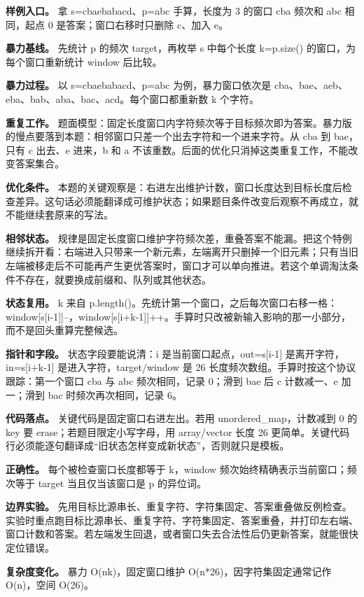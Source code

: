 \textbf{样例入口。} 拿 s=cbaebabacd、p=abc 手算，长度为 3 的窗口 cba 频次和 abc 相同，起点 0 是答案；窗口右移时只删除 c、加入 e。

\textbf{暴力基线。} 先统计 p 的频次 target，再枚举 s 中每个长度 k=p.size() 的窗口，为每个窗口重新统计 window 后比较。

\textbf{暴力过程。} 以 s=cbaebabacd、p=abc 为例，暴力窗口依次是 cba、bae、aeb、eba、bab、aba、bac、acd。每个窗口都重新数 k 个字符。

\textbf{重复工作。} 题面模型：固定长度窗口内字符频次等于目标频次即为答案。暴力版的慢点要落到本题：相邻窗口只差一个出去字符和一个进来字符。从 cba 到 bae，只有 c 出去、e 进来，b 和 a 不该重数。后面的优化只消掉这类重复工作，不能改变答案集合。

\textbf{优化条件。} 本题的关键观察是：右进左出维护计数，窗口长度达到目标长度后检查差异。这句话必须能翻译成可维护状态；如果题目条件改变后观察不再成立，就不能继续套原来的写法。

\textbf{相邻状态。} 规律是固定长度窗口维护字符频次差，重叠答案不能漏。把这个特例继续拆开看：右端进入只带来一个新元素，左端离开只删掉一个旧元素；只有当旧左端被移走后不可能再产生更优答案时，窗口才可以单向推进。若这个单调淘汰条件不存在，就要换成前缀和、队列或其他状态。

\textbf{状态复用。} k 来自 p.length()。先统计第一个窗口，之后每次窗口右移一格：window[s[i-1]]--，window[s[i+k-1]]++。手算时只改被新输入影响的那一小部分，而不是回头重算完整候选。

\textbf{指针和字段。} 状态字段要能说清：i 是当前窗口起点，out=s[i-1] 是离开字符，in=s[i+k-1] 是进入字符，target/window 是 26 长度频次数组。手算时按这个协议跟踪：第一个窗口 cba 与 abc 频次相同，记录 0；滑到 bae 后 c 计数减一、e 加一；滑到 bac 时频次再次相同，记录 6。

\textbf{代码落点。} 关键代码是固定窗口右进左出。若用 unordered\_map，计数减到 0 的 key 要 erase；若题目限定小写字母，用 array/vector 长度 26 更简单。关键代码行必须能逐句翻译成“旧状态怎样变成新状态”，否则就只是模板。

\textbf{正确性。} 每个被检查窗口长度都等于 k，window 频次始终精确表示当前窗口；频次等于 target 当且仅当该窗口是 p 的异位词。

\textbf{边界实验。} 先用目标比源串长、重复字符、字符集固定、答案重叠做反例检查。实验时重点跑目标比源串长、重复字符、字符集固定、答案重叠，并打印左右端、窗口计数和答案。若左端发生回退，或者窗口失去合法性后仍更新答案，就能很快定位错误。

\textbf{复杂度变化。} 暴力 O(nk)，固定窗口维护 O(n*26)，因字符集固定通常记作 O(n)，空间 O(26)。

